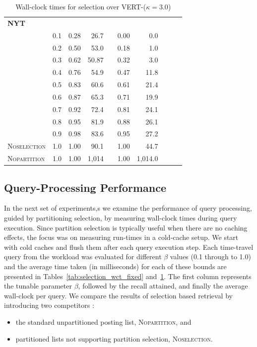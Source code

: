 \begin{table}
\begin{tabular}{@{}llrrrrrrrr@{}}
\midrule
\textbf{NYT}\\
& 0.1 & 0.28 & 26.7 && 0.00 & 0.0\\
& 0.2 & 0.50 & 53.0 && 0.18 & 1.0\\
& 0.3 & 0.62 & 50.87 && 0.32 & 3.0\\
& 0.4 & 0.76 & 54.9 && 0.47 & 11.8\\
& 0.5 & 0.83 & 60.6 && 0.61 & 21.4\\
& 0.6 & 0.87 & 65.3 && 0.71 & 19.9\\
& 0.7 & 0.92 & 72.4 && 0.81 & 24.1\\
& 0.8 & 0.95 & 81.9 && 0.88 & 26.1\\
& 0.9 & 0.98 & 83.6 && 0.95 & 27.2\\
\textsc{Noselection}& 1.0 & 1.00 & 90.1 && 1.00 & 44.7\\
\textsc{Nopartition} & 1.0 & 1.00 & 1,014 && 1.00 & 1,014.0\\
   \bottomrule
  \end{tabular}
\caption{Wall-clock times for selection over VERT-($\kappa = 3.0$)}

\label{tab:selection_wct_vert}
\end{table}

\subsection {Query-Processing Performance}
\label{subsec:runtimes}

In the next set of experiments,s we examine the performance of query processing, guided by partitioning selection, by measuring wall-clock times during query execution. Since partition selection is typically useful when there are no caching effects, the focus was on measuring run-times in a cold-cache setup. We start with cold caches and flush them after each query execution step. Each time-travel query from the workload was evaluated for different $\beta$ values (0.1 through to 1.0) and the average time taken (in milliseconds) for each of these bounds are presented in Tables~\ref{tab:selection_wct_fixed} and~\ref{tab:selection_wct_vert}. The first column represents the tunable parameter $\beta$, followed by the recall attained, and finally the average wall-clock per query. We compare the results of selection based retrieval by introducing two competitors : 

\begin{itemize}
  \item the standard unpartitioned posting list, \textsc{Nopartition}, and

  \item partitioned lists not supporting partition selection, \textsc{Noselection}.

\end{itemize}

